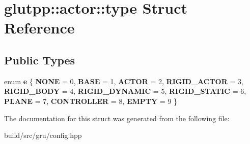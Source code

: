 \hypertarget{structglutpp_1_1actor_1_1type}{\section{glutpp\-:\-:actor\-:\-:type \-Struct \-Reference}
\label{structglutpp_1_1actor_1_1type}
}
\subsection*{\-Public \-Types}
\begin{DoxyCompactItemize}
\item 
enum {\bfseries e} \{ \*
{\bfseries \-N\-O\-N\-E} =  0, 
{\bfseries \-B\-A\-S\-E} =  1, 
{\bfseries \-A\-C\-T\-O\-R} =  2, 
{\bfseries \-R\-I\-G\-I\-D\-\_\-\-A\-C\-T\-O\-R} =  3, 
\*
{\bfseries \-R\-I\-G\-I\-D\-\_\-\-B\-O\-D\-Y} =  4, 
{\bfseries \-R\-I\-G\-I\-D\-\_\-\-D\-Y\-N\-A\-M\-I\-C} =  5, 
{\bfseries \-R\-I\-G\-I\-D\-\_\-\-S\-T\-A\-T\-I\-C} =  6, 
{\bfseries \-P\-L\-A\-N\-E} =  7, 
\*
{\bfseries \-C\-O\-N\-T\-R\-O\-L\-L\-E\-R} =  8, 
{\bfseries \-E\-M\-P\-T\-Y} =  9
 \}
\end{DoxyCompactItemize}


\-The documentation for this struct was generated from the following file\-:\begin{DoxyCompactItemize}
\item 
build/src/gru/config.\-hpp\end{DoxyCompactItemize}
